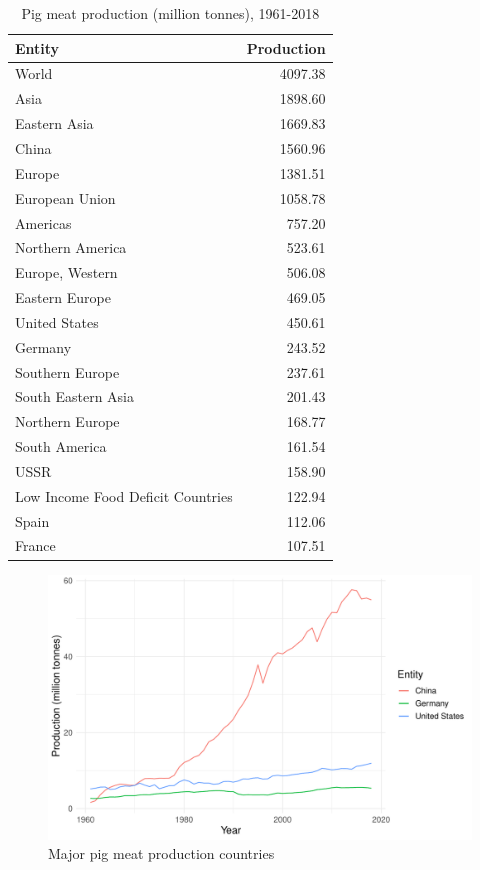 \documentclass[11pt,a4paper,]{article}
\begin{document}
\begin{table}

\caption{\label{tab:pig}Pig meat production (million tonnes), 1961-2018}
\centering
\begin{tabular}[t]{lr}
\toprule
Entity & Production\\
\midrule
World & 4097.38\\
Asia & 1898.60\\
Eastern Asia & 1669.83\\
China & 1560.96\\
Europe & 1381.51\\
\addlinespace
European Union & 1058.78\\
Americas & 757.20\\
Northern America & 523.61\\
Europe, Western & 506.08\\
Eastern Europe & 469.05\\
\addlinespace
United States & 450.61\\
Germany & 243.52\\
Southern Europe & 237.61\\
South Eastern Asia & 201.43\\
Northern Europe & 168.77\\
\addlinespace
South America & 161.54\\
USSR & 158.90\\
Low Income Food Deficit Countries & 122.94\\
Spain & 112.06\\
France & 107.51\\
\bottomrule
\end{tabular}
\end{table}

\begin{figure}
\centering
\includegraphics{report_files/figure-latex/pig-1.pdf}
\caption{\label{fig:pig}Major pig meat production countries}
\end{figure}
\end{document}
